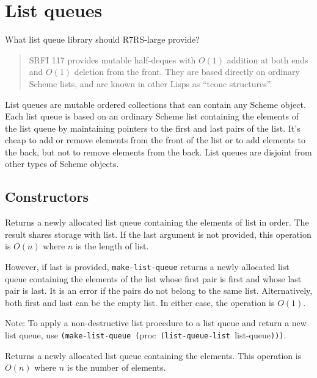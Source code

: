 \section{List queues}
  What list queue library should R7RS-large provide?

\begin{quote}
SRFI 117 provides mutable half-deques with $O(1)$ addition at both ends
and $O(1)$ deletion from the front. They are based directly on ordinary
Scheme lists, and are known in other Lisps as ``tconc structures''.
\end{quote}

List queues are mutable ordered collections that can contain any Scheme
object. Each list queue is based on an ordinary Scheme list containing
the elements of the list queue by maintaining pointers to the first and
last pairs of the list. It's cheap to add or remove elements from the
front of the list or to add elements to the back, but not to remove
elements from the back. List queues are disjoint from other types of
Scheme objects.



\subsection{Constructors}\label{Constructors}

\begin{entry}{%
  }

  Returns a newly allocated list queue containing the elements of list
  in order. The result shares storage with list. If the last argument
  is not provided, this operation is $O(n)$ where $n$ is the length of
  list.

  However, if last is provided, \texttt{make-list-queue} returns a
  newly allocated list queue containing the elements of the list whose
  first pair is first and whose last pair is last. It is an error if
  the pairs do not belong to the same list. Alternatively, both first
  and last can be the empty list. In either case, the operation is
  $O(1)$.

  Note: To apply a non-destructive list procedure to a list queue and
  return a new list queue, use \texttt{(make-list-queue\
    (}proc\texttt{\ (list-queue-list\ }list-queue\texttt{)))}.
\end{entry}

\begin{entry}{%
  }

  Returns a newly allocated list queue containing the elements. This
  operation is $O(n)$ where $n$ is the number of elements.
\end{entry}

